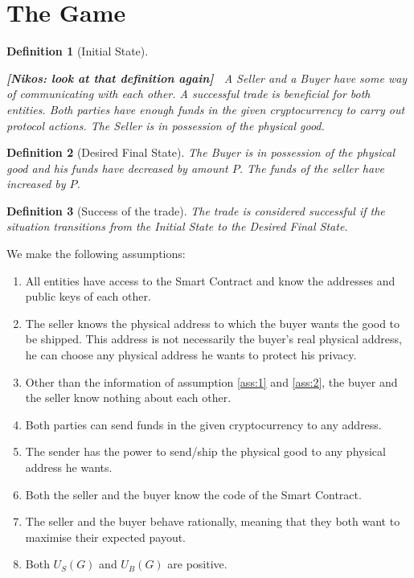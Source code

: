 \documentclass{cacthesis}
\newcommand{\authnote}[3]{{ \footnotesize \textbf{#1[#2: #3]~}}}
\newcommand{\niknote}[1]{\authnote{\color{red}}{Nikos}{#1}}
\newtheorem{definition}{Definition}
\begin{document}
\section{The Game}
\label{sec:the-game}
\begin{definition}[Initial State]
\label{def:initial-state}

\niknote{look at that definition again}
A Seller and a Buyer have some way of communicating with each other. A successful trade is beneficial for both entities. Both parties have enough funds in the given cryptocurrency to carry out protocol actions. The Seller is in possession of the physical good.
\end{definition} 


\begin{definition}[Desired Final State]
\label{def:desired-final-state}
The Buyer is in possession of the physical good and his funds have decreased by amount $P$. The funds of the seller have increased by $P$.
\end{definition}

\begin{definition}[Success of the trade]
The trade is considered successful if the situation transitions from the Initial State to the Desired Final State.
\end{definition}

We make the following assumptions:
\begin{enumerate}
    \item All entities have access to the Smart Contract and know the addresses and public keys of each other.
    \label{ass:1}
    \item The seller knows the physical address to which the buyer wants the good to be shipped. This address is not necessarily the buyer's real physical address, he can choose any physical address he wants to protect his privacy.
    \label{ass:2}
    \item Other than the information of assumption \ref{ass:1} and \ref{ass:2}, the buyer and the seller know nothing about each other.
    \label{ass:3}
    \item Both parties can send funds in the given cryptocurrency to any address.
    \label{ass:4}
    \item The sender has the power to send/ship the physical good to any physical address he wants.
    \label{ass:5}
    \item Both the seller and the buyer know the code of the Smart Contract.
    \label{ass:6}
    \item The seller and the buyer behave rationally, meaning that they both want to maximise their expected payout.
    \item Both $U_S(G)$ and $U_B(G)$ are positive. 
\end{enumerate}
\end{document}
